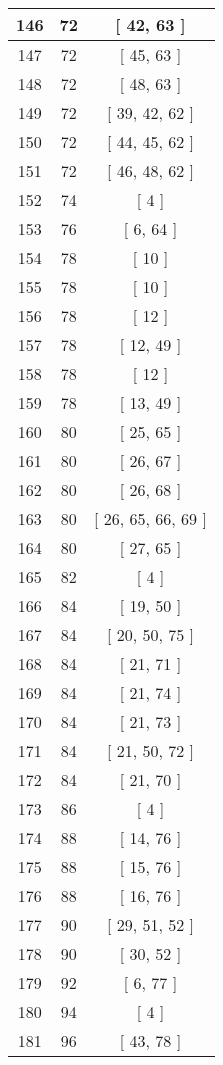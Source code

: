 \begin{center}
\begin{longtable}[H]{|| c c c ||}
\hline
146 & 72 & [ 42, 63 ] \\ 
\hline
147 & 72 & [ 45, 63 ] \\ 
\hline
148 & 72 & [ 48, 63 ] \\ 
\hline
149 & 72 & [ 39, 42, 62 ] \\ 
\hline
150 & 72 & [ 44, 45, 62 ] \\ 
\hline
151 & 72 & [ 46, 48, 62 ] \\ 
\hline
152 & 74 & [ 4 ] \\ 
\hline
153 & 76 & [ 6, 64 ] \\ 
\hline
154 & 78 & [ 10 ] \\ 
\hline
155 & 78 & [ 10 ] \\ 
\hline
156 & 78 & [ 12 ] \\ 
\hline
157 & 78 & [ 12, 49 ] \\ 
\hline
158 & 78 & [ 12 ] \\ 
\hline
159 & 78 & [ 13, 49 ] \\ 
\hline
160 & 80 & [ 25, 65 ] \\ 
\hline
161 & 80 & [ 26, 67 ] \\ 
\hline
162 & 80 & [ 26, 68 ] \\ 
\hline
163 & 80 & [ 26, 65, 66, 69 ] \\ 
\hline
164 & 80 & [ 27, 65 ] \\ 
\hline
165 & 82 & [ 4 ] \\ 
\hline
166 & 84 & [ 19, 50 ] \\ 
\hline
167 & 84 & [ 20, 50, 75 ] \\ 
\hline
168 & 84 & [ 21, 71 ] \\ 
\hline
169 & 84 & [ 21, 74 ] \\ 
\hline
170 & 84 & [ 21, 73 ] \\ 
\hline
171 & 84 & [ 21, 50, 72 ] \\ 
\hline
172 & 84 & [ 21, 70 ] \\ 
\hline
173 & 86 & [ 4 ] \\ 
\hline
174 & 88 & [ 14, 76 ] \\ 
\hline
175 & 88 & [ 15, 76 ] \\ 
\hline
176 & 88 & [ 16, 76 ] \\ 
\hline
177 & 90 & [ 29, 51, 52 ] \\ 
\hline
178 & 90 & [ 30, 52 ] \\ 
\hline
179 & 92 & [ 6, 77 ] \\ 
\hline
180 & 94 & [ 4 ] \\ 
\hline
181 & 96 & [ 43, 78 ] \\ 

\end{longtable}
\end{center}
